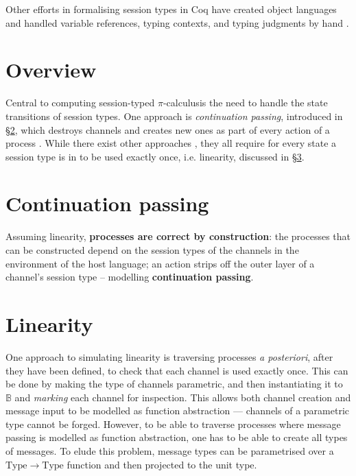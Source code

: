\documentclass{mproj}
\newcommand{\picalc}{$\pi$-calculus}
\begin{document}
Other efforts in formalising session types in Coq have created object languages and handled variable references, typing contexts, and typing judgments by hand \cite{Dilmore2019}.


\section{Overview}\label{overview}



Central to computing session-typed \picalc is the need to handle the state transitions of session types. One approach is \emph{continuation passing}, introduced in \S \ref{continuation-passing}, which destroys channels and creates new ones as part of every action of a process \cite{Dardha2016}. While there exist other approaches , they all require for every state a session type is in to be used exactly once, i.e. linearity, discussed in \S \ref{linearity}.


\section{Continuation passing}\label{continuation-passing}

\cite{Vasconcelos2010}


Assuming linearity, \textbf{processes are correct by construction}: the processes that can be constructed depend on the session types of the channels in the environment of the host language; an action strips off the outer layer of a channel's session type -- modelling \textbf{continuation passing}.

\section{Linearity}\label{linearity}

\cite{Kobayashi1999}
\cite{Toninho2011}

One approach to simulating linearity is traversing processes \emph{a posteriori}, after they have been defined, to check that each channel is used exactly once. This can be done by making the type of channels parametric, and then instantiating it to $\mathbb{B}$ and \emph{marking} each channel for inspection. This allows both channel creation and message input to be modelled as function abstraction --- channels of a parametric type cannot be forged.  However, to be able to traverse processes where message passing is modelled as function abstraction, one has to be able to create all types of messages. To elude this problem, message types can be parametrised over a $\mathrm{Type} \rightarrow \mathrm{Type}$ function and then projected to the unit type.
    
\end{document}
